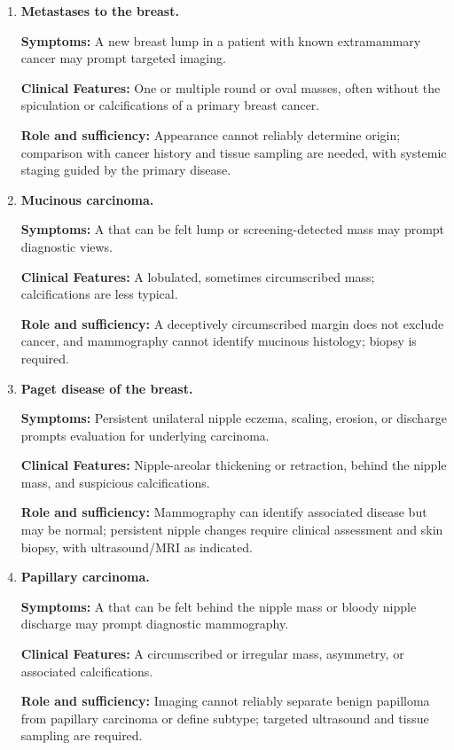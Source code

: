 \begin{enumerate}[leftmargin=*,itemsep=0.45em,topsep=0.4em]
\item \textbf{Metastases to the breast.}\par\noindent\textbf{Symptoms:} A new breast lump in a patient with known extramammary cancer may prompt targeted imaging.\par\noindent\textbf{Clinical Features:} One or multiple round or oval masses, often without the spiculation or calcifications of a primary breast cancer.\par\noindent\textbf{Role and sufficiency:} Appearance cannot reliably determine origin; comparison with cancer history and tissue sampling are needed, with systemic staging guided by the primary disease.
\item \textbf{Mucinous carcinoma.}\par\noindent\textbf{Symptoms:} A that can be felt lump or screening-detected mass may prompt diagnostic views.\par\noindent\textbf{Clinical Features:} A lobulated, sometimes circumscribed mass; calcifications are less typical.\par\noindent\textbf{Role and sufficiency:} A deceptively circumscribed margin does not exclude cancer, and mammography cannot identify mucinous histology; biopsy is required.
\item \textbf{Paget disease of the breast.}\par\noindent\textbf{Symptoms:} Persistent unilateral nipple eczema, scaling, erosion, or discharge prompts evaluation for underlying carcinoma.\par\noindent\textbf{Clinical Features:} Nipple-areolar thickening or retraction, behind the nipple mass, and suspicious calcifications.\par\noindent\textbf{Role and sufficiency:} Mammography can identify associated disease but may be normal; persistent nipple changes require clinical assessment and skin biopsy, with ultrasound/MRI as indicated.
\item \textbf{Papillary carcinoma.}\par\noindent\textbf{Symptoms:} A that can be felt behind the nipple mass or bloody nipple discharge may prompt diagnostic mammography.\par\noindent\textbf{Clinical Features:} A circumscribed or irregular mass, asymmetry, or associated calcifications.\par\noindent\textbf{Role and sufficiency:} Imaging cannot reliably separate benign papilloma from papillary carcinoma or define subtype; targeted ultrasound and tissue sampling are required.

\end{enumerate}
